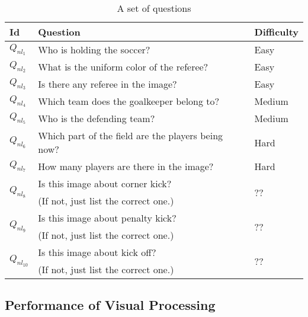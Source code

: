 \begin{table}[thb] 
\footnotesize
\begin{tabular}{|l|l|l|}
\hline
Id & Question                                           & Difficulty \\ \hline
$Q_{nl_1}$  & Who is holding the soccer?                         & Easy       \\ \hline
$Q_{nl_2}$  & What is the uniform color of the referee?           & Easy       \\ \hline
$Q_{nl_3}$  & Is there any referee in the image?                 & Easy       \\ \hline
$Q_{nl_4}$  & Which team does the goalkeeper belong to?          & Medium       \\ \hline
$Q_{nl_5}$  & Who is the defending team?                         & Medium       \\ \hline
$Q_{nl_6}$  & Which part of the field are the players being now? & Hard       \\ \hline
$Q_{nl_7}$  & How many players are there in the image?           & Hard     \\ \hline

\multirow{2}{*}{$Q_{nl_8}$ }
 & Is this image about corner kick?           &  \multirow{2}{*}{\color{red}??}  \\ 
 & {\color{red}(If not, just list the correct one.)}  & \\ \hline
 
\multirow{2}{*}{$Q_{nl_9}$}  &   Is this image about penalty kick?  &  \multirow{2}{*}{\color{red}??}    \\ 
 & {\color{red}(If not, just list the correct one.)}  &  \\ \hline
 
\multirow{2}{*}{$Q_{nl_{10}}$}  &  Is this image about kick off?  &  \multirow{2}{*}{\color{red}??}    \\ 
 & {\color{red}(If not, just list the correct one.)}  &  \\ \hline
 
\end{tabular} 
\caption{A set of questions} \label{table:questions}
\end{table}




\subsection{Performance of Visual Processing}

